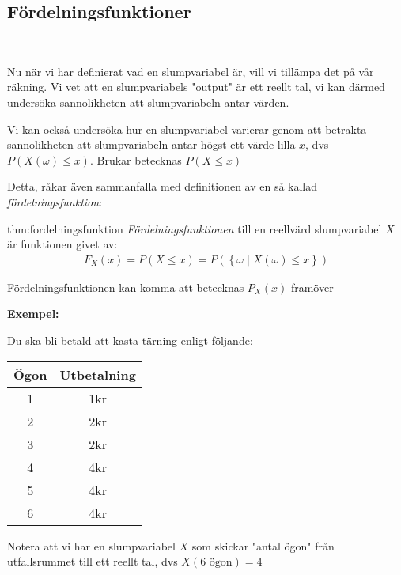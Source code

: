 \subsection{Fördelningsfunktioner}\hfill\\\par
\noindent Nu när vi har definierat vad en slumpvariabel är, vill vi tillämpa det på vår räkning. Vi vet att en slumpvariabels "output" är ett reellt tal, vi kan därmed undersöka sannolikheten att slumpvariabeln antar värden.\par
\noindent Vi kan också undersöka hur en slumpvariabel varierar genom att betrakta sannolikheten att slumpvariabeln antar högst ett värde lilla $x$, dvs $P(X(\omega)\leq x)$. Brukar betecknas $P(X\leq x)$ 
\par\bigskip
\noindent Detta, råkar även sammanfalla med definitionen av en så kallad \textit{fördelningsfunktion}:
\par\bigskip
\begin{theo}[Fördelningsfunktion]{thm:fordelningsfunktion}
  \textit{Fördelningsfunktionen} till en reellvärd slumpvariabel $X$ är funktionen givet av:
  \begin{equation*}
    \begin{gathered}
      F_X(x) = P(X\leq x) = P(\left\{\omega\;|\;X(\omega)\leq x\right\})
    \end{gathered}
  \end{equation*}
  \par\bigskip
  \noindent Fördelningsfunktionen kan komma att betecknas $P_X(x)$ framöver 
\end{theo}
\par\bigskip
\noindent\textbf{Exempel:}\par
\noindent Du ska bli betald att kasta tärning enligt följande:
\par\bigskip
\begin{center}
  \begin{tabular}{c|c}
    Ögon&Utbetalning\\
    \hline
    1&1kr\\
    2&2kr\\
    3&2kr\\
    4&4kr\\
    5&4kr\\
    6&4kr
  \end{tabular}
\end{center}
\par\bigskip
\noindent Notera att vi har en slumpvariabel $X$ som skickar "antal ögon" från utfallsrummet till ett reellt tal, dvs $X(6 \text{ ögon}) = 4$ 
